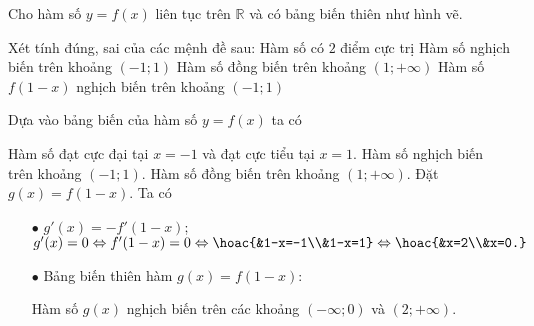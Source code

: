 \begin{ex}%
    Cho hàm số $y=f(x)$ liên tục trên $\mathbb{R}$ và có bảng biến thiên như hình vẽ.
    \begin{center}
    \end{center}
    Xét tính đúng, sai của các mệnh đề sau:
    \choiceTF
    {\True Hàm số có $2$ điểm cực trị}
    {\True Hàm số nghịch biến trên khoảng $(-1;1)$}
    {\True Hàm số đồng biến trên khoảng $(1;+\infty)$}
    {Hàm số $f(1-x)$ nghịch biến trên khoảng $(-1;1)$}
    \loigiai
    {Dựa vào bảng biến của hàm số $y=f(x)$ ta có
        \begin{itemchoice}
            \itemch Hàm số đạt cực đại tại $x=-1$ và đạt cực tiểu tại $x=1$.
            \itemch Hàm số nghịch biến trên khoảng $(-1;1)$.
            \itemch Hàm số đồng biến trên khoảng $(1;+\infty)$.
            \itemch Đặt $g(x)=f(1-x)$. Ta có
            \begin{itemize}
                \item [$\bullet$] $g'(x)=-f'(1-x)$; \\
                $g'(x)=0 \Leftrightarrow f'(1-x)=0 \Leftrightarrow \hoac{&1-x=-1\\&1-x=1}\Leftrightarrow \hoac{&x=2\\&x=0.}$
                \item [$\bullet$] Bảng biến thiên hàm $g(x)=f(1-x)$:
                \begin{center}
                \end{center}
                Hàm số $g(x)$ nghịch biến trên các khoảng $(-\infty;0)$ và $(2;+\infty)$.
            \end{itemize}
        \end{itemchoice}
    }
\end{ex}

